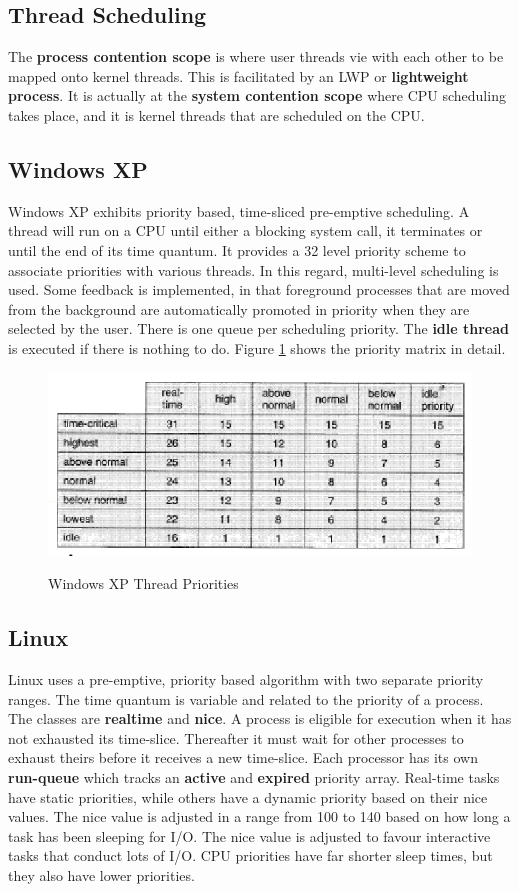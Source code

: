 \documentclass[10pt,a4paper]{article}
\begin{document}
\subsection{Thread Scheduling}
The {\bf process contention scope} is where user threads vie with each other to be mapped onto kernel threads. This is facilitated by an LWP or {\bf lightweight process}. It is actually at the {\bf system contention scope} where CPU scheduling takes place, and it is kernel threads that are  scheduled on the CPU. 
\subsection{Windows XP}
Windows XP exhibits priority based, time-sliced pre-emptive scheduling. A thread will run on a CPU until either a blocking system call, it terminates or until the end of its time quantum. It provides a 32 level priority scheme to associate priorities with various threads. In this regard, multi-level scheduling is used. Some feedback is implemented, in that foreground processes that are moved from the background are automatically promoted in priority when they are selected by the user. There is one queue per scheduling priority. The {\bf idle thread} is executed if there is nothing to do. Figure \ref{xpched} shows the priority matrix in detail. 
\begin{figure}
\caption{Windows XP Thread Priorities \cite{OSCONCEPTS}}
\begin{center}
\includegraphics[scale=0.45]{../images/xp-sched.png}
\label{xpched}
\end{center}
\end{figure}
\subsection{Linux}
Linux uses a pre-emptive, priority based algorithm with two separate priority ranges. The time quantum is variable and related to the priority of a process. The classes are {\bf realtime} and {\bf nice}. A process is eligible for execution when it has not exhausted its time-slice. Thereafter it must wait for other processes to exhaust theirs before it receives a new time-slice. Each processor has its own {\bf run-queue} which tracks an {\bf active} and {\bf expired} priority array. Real-time tasks have static priorities, while others have a dynamic priority based on their nice values.  The nice value is adjusted in a range from 100 to 140 based on how long a task has been sleeping for I/O. The nice value is adjusted to favour interactive tasks that conduct lots of I/O. CPU priorities have far shorter sleep times, but they also have lower priorities. 

{}

\begin{center}
\end{center}
\end{document}

